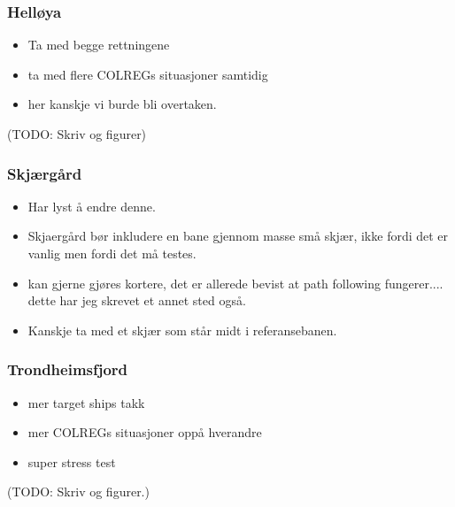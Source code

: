 \subsubsection{Helløya}
\begin{itemize}
    \item Ta med begge rettningene
    \item ta med flere COLREGs situasjoner samtidig
    \item her kanskje vi burde bli overtaken.
\end{itemize}
(TODO: Skriv og figurer)

\subsubsection{Skjærgård}
\begin{itemize}
    \item Har lyst å endre denne.
    \item Skjaergård bør inkludere en bane gjennom masse små skjær, ikke fordi det er vanlig men fordi det må testes.
    \item kan gjerne gjøres kortere, det er allerede bevist at path following fungerer.... dette har jeg skrevet et annet sted også.
    \item Kanskje ta med et skjær som står midt i referansebanen.
\end{itemize}

\subsubsection{Trondheimsfjord}
\begin{itemize}
    \item mer target ships takk
    \item mer COLREGs situasjoner oppå hverandre
    \item super stress test
\end{itemize}
(TODO: Skriv og figurer.)

